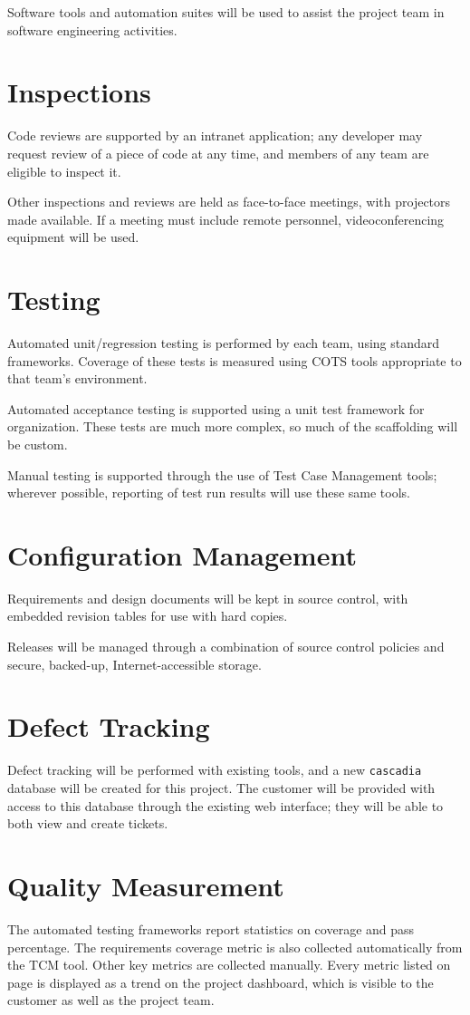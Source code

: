 \documentclass[11pt]{wacomepd}
\begin{document}
Software tools and automation suites will be used to assist the project team in software engineering
activities.

\section{Inspections}
Code reviews are supported by an intranet application; any developer may request review of a
piece of code at any time, and members of any team are eligible to inspect it.

Other inspections and reviews are held as face-to-face meetings, with projectors made available.  If
a meeting must include remote personnel, videoconferencing equipment will be used.


\section{Testing}
Automated unit/regression testing is performed by each team, using standard frameworks.  Coverage of
these tests is measured using COTS tools appropriate to that team's environment.

Automated acceptance testing is supported using a unit test framework for organization.  These tests
are much more complex, so much of the scaffolding will be custom.

Manual testing is supported through the use of Test Case Management tools; wherever possible,
reporting of test run results will use these same tools.

\section{Configuration Management}
Requirements and design documents will be kept in source control, with embedded revision tables for
use with hard copies.

Releases will be managed through a combination of source control policies and secure, backed-up,
Internet-accessible storage.

\section{Defect Tracking}
Defect tracking will be performed with existing tools, and a new {\tt cascadia} database will be
created for this project.  The customer will be provided with access to this database through the
existing web interface; they will be able to both view and create tickets.


\section{Quality Measurement}
The automated testing frameworks report statistics on coverage and pass percentage.  The
requirements coverage metric is also collected automatically from the TCM tool.  Other key metrics
are collected manually.  Every metric listed on page \pageref{metrics} is displayed as a trend on the
project dashboard, which is visible to the customer as well as the project team.
\end{document}
